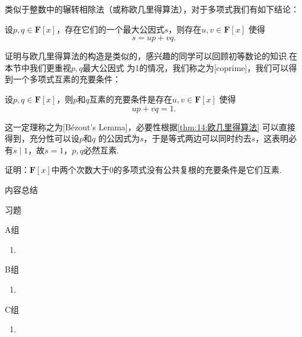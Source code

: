 类似于整数中的辗转相除法（或称欧几里得算法），对于多项式我们有如下结论：
\begin{theorem}\label{thm:14:欧几里得算法}
    设$p,q\in\mathbf{F}[x]$，存在它们的一个最大公因式$s$，则存在$u,v\in\mathbf{F}[x]$
    使得\[s=up+vq.\]
\end{theorem}
证明与欧几里得算法的构造是类似的，感兴趣的同学可以回顾初等数论的知识.在本节中我们更重视$p,q$最大公因式
为1的情况，我们称之为[coprime]，我们可以得到一个多项式互素的充要条件：
\begin{theorem}\label{thm:14:裴蜀定理}
    设$p,q\in\mathbf{F}[x]$，则$p$和$q$互素的充要条件是存在$u,v\in\mathbf{F}[x]$
    使得\[up+vq=1.\]
\end{theorem}
这一定理称之为[B\'ezout's Lemma]，必要性根据\autoref{thm:14:欧几里得算法} 可以直接得到，充分性可以设$p$和$q$
的公因式为$s$，于是等式两边可以同时约去$s$，这表明必有$s \mid 1$，故$s=1$，$p,q$必然互素.
\begin{example}
    证明：$\mathbf{F}[x]$中两个次数大于0的多项式没有公共复根的充要条件是它们互素.
\end{example}

\vspace{2ex}
\centerline{\heiti \Large 内容总结}

\vspace{2ex}

\centerline{\heiti \Large 习题}
\vspace{2ex}
{\kaishu }
\begin{flushright}
    \kaishu

\end{flushright}
\centerline{\heiti A组}
\begin{enumerate}
    \item
\end{enumerate}
\centerline{\heiti B组}
\begin{enumerate}
    \item
\end{enumerate}
\centerline{\heiti C组}
\begin{enumerate}
    \item
\end{enumerate}
